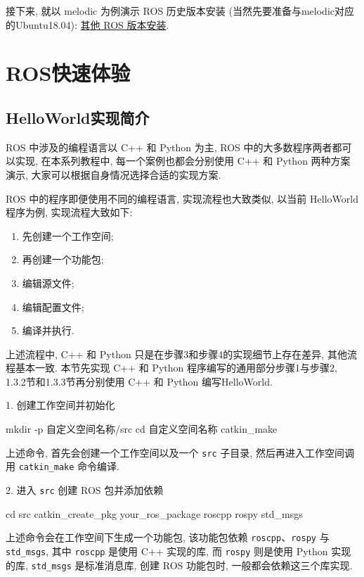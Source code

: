 \documentclass[openany, fontset=windowsold]{ctexbook}
\theoremstyle{kaiti}
\theoremstyle{normal}
\begin{document}
接下来, 就以 melodic 为例演示 ROS 历史版本安装 (当然先要准备与melodic对应的Ubuntu18.04): \href{http://www.autolabor.com.cn/book/ROSTutorials/chapter1/12-roskai-fa-gong-ju-an-zhuang/127-zi-65993a-qi-ta-ros-ban-ben-an-zhuang.html}{其他 ROS 版本安装}.

\section{ROS快速体验}

\subsection{HelloWorld实现简介}

ROS 中涉及的编程语言以 C++ 和 Python 为主, ROS 中的大多数程序两者都可以实现, 在本系列教程中, 每一个案例也都会分别使用 C++ 和 Python 两种方案演示, 大家可以根据自身情况选择合适的实现方案.

ROS 中的程序即便使用不同的编程语言, 实现流程也大致类似, 以当前 HelloWorld 程序为例, 实现流程大致如下: 

\begin{enumerate}
  \item 先创建一个工作空间; 
  \item 再创建一个功能包; 
  \item 编辑源文件; 
  \item 编辑配置文件; 
  \item 编译并执行.
\end{enumerate}

上述流程中, C++ 和 Python 只是在步骤3和步骤4的实现细节上存在差异, 其他流程基本一致. 本节先实现 C++ 和 Python 程序编写的通用部分步骤1与步骤2, 1.3.2节和1.3.3节再分别使用 C++ 和 Python 编写HelloWorld.

1. 创建工作空间并初始化

\begin{bash}
  mkdir -p 自定义空间名称/src
  cd 自定义空间名称
  catkin_make
\end{bash}

上述命令, 首先会创建一个工作空间以及一个 \verb|src| 子目录, 然后再进入工作空间调用 \verb|catkin_make| 命令编译.

2. 进入 \verb|src| 创建 ROS 包并添加依赖

\begin{bash}
  cd src
  catkin_create_pkg your_ros_package roscpp rospy std_msgs
\end{bash}

上述命令会在工作空间下生成一个功能包, 该功能包依赖 \verb|roscpp|、\verb|rospy| 与 \verb|std_msgs|, 其中 \verb|roscpp| 是使用 C++ 实现的库, 而 \verb|rospy| 则是使用 Python 实现的库, \verb|std_msgs| 是标准消息库, 创建 ROS 功能包时, 一般都会依赖这三个库实现.
\end{document}
